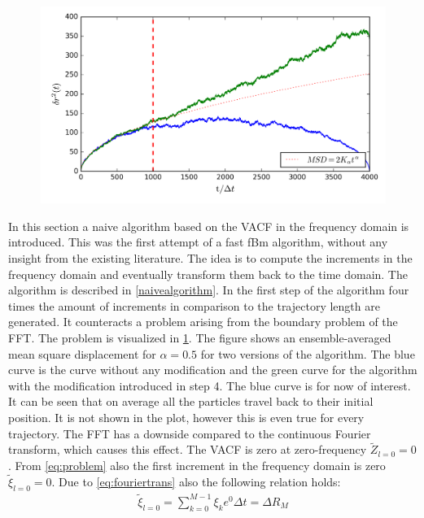 \documentclass[
  a4paper,BCOR10mm,oneside,
  headsepline,footsepline,%
  fleqn,openbib
]{scrbook}
\begin{document}
\begin{figure}[h]
  \centering
  \includegraphics[width=\textwidth]{./data/nocorrectionmsd1.png}
  \captionsetup{width=\linewidth}
  \label{fig:41}
\end{figure}
In this section a naive algorithm based on the VACF in the frequency domain is introduced. This was the first attempt of a fast fBm algorithm, without any insight from the existing literature. The idea is to compute the increments in the frequency domain and eventually transform them back to the time domain. The algorithm is described in \cref{naivealgorithm}. In the first step of the algorithm four times the amount of increments in comparison to the trajectory length are generated. It counteracts a problem arising from the boundary problem of the FFT. The problem is visualized in \cref{fig:41}. The figure shows an ensemble-averaged mean square displacement for $\alpha=0.5$ for two versions of the algorithm. The blue curve is the curve without any modification and the green curve  for the algorithm with the modification introduced in step 4. The blue curve is for now of interest. It can be seen that on average all the particles travel back to their initial position. It is not shown in the plot, however this is even true for every trajectory. The FFT has a downside compared to the continuous Fourier transform, which causes this effect. The VACF is zero at zero-frequency $ \tilde{Z}_{l=0}=0$.  From \cref{eq:problem} also the first increment in the frequency domain is zero $ \tilde{\xi}_{l=0}=0$. Due to \cref{eq:fouriertrans} also the following relation holds:
 \begin{align}
   \tilde{\xi}_{l=0} = \sum_{k=0}^{M-1} \xi_k e^{0} \Delta t = \Delta  R_{M} \label{correction}
 \end{align}
\end{document}
